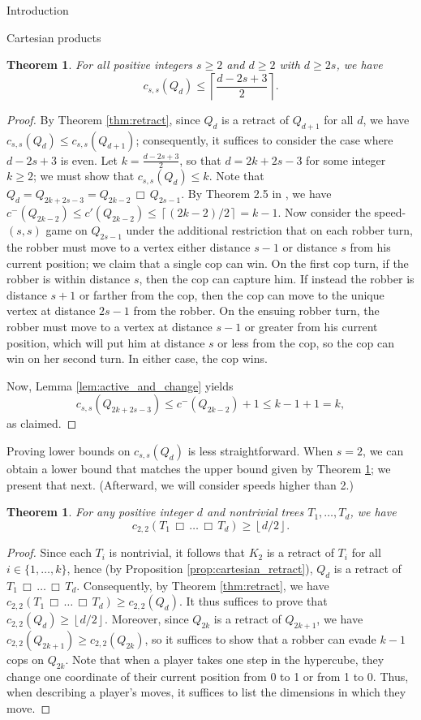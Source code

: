 \documentclass[12pt]{amsart}
\newcommand{\floor}[1]{\ensuremath{\left\lfloor #1\right\rfloor} }
\newcommand{\ceil}[1]{\ensuremath{\left\lceil #1\right\rceil} }
\newtheorem{theorem}[lemma]{Theorem}
\theoremstyle{definition}
\def\cart{\, \Box \,}
\newcommand{\speeds}{c_{s,s}}
\newcommand{\speedtwo}{c_{2,2}}
\begin{document}
\begin{section}{Introduction}
\begin{section}{Cartesian products}
\begin{theorem}\label{thm:hypercube_upper}
For all positive integers $s \ge 2$ and $d \ge 2$ with $d \ge 2s$, we have 
\[\speeds(Q_d) \le \ceil{\frac{d-2s+3}{2}}.\]
\end{theorem}
\begin{proof}
By Theorem \ref{thm:retract}, since $Q_d$ is a retract of $Q_{d+1}$ for all $d$, we have $\speeds(Q_d) \le \speeds(Q_{d+1})$; consequently, it suffices to consider the case where $d-2s+3$ is even.  Let $k = \frac{d-2s+3}{2}$, so that $d = 2k+2s-3$ for some integer $k \ge 2$; we must show that $\speeds(Q_d) \le k$.  Note that $Q_d = Q_{2k+2s-3} = Q_{2k-2} \cart Q_{2s-1}$.  By Theorem 2.5 in \cite{NN98}, we have $c^-(Q_{2k-2}) \le c'(Q_{2k-2}) \le \ceil{(2k-2)/2} = k-1$.  Now consider the speed-$(s,s)$ game on $Q_{2s-1}$ under the additional restriction that on each robber turn, the robber must move to a vertex either distance $s-1$ or distance $s$ from his current position; we claim that a single cop can win.  On the first cop turn, if the robber is within distance $s$, then the cop can capture him.  If instead the robber is distance $s+1$ or farther from the cop, then the cop can move to the unique vertex at distance $2s-1$ from the robber.  On the ensuing robber turn, the robber must move to a vertex at distance $s-1$ or greater from his current position, which will put him at distance $s$ or less from the cop, so the cop can win on her second turn.  In either case, the cop wins.

Now, Lemma \ref{lem:active_and_change} yields 
\[\speeds(Q_{2k+2s-3}) \le c^-(Q_{2k-2}) + 1 \le k-1+1 = k,\]
as claimed.
\end{proof}

Proving lower bounds on $\speeds(Q_d)$ is less straightforward.  When $s=2$, we can obtain a lower bound that matches the upper bound given by Theorem \ref{thm:hypercube_upper}; we present that next.  (Afterward, we will consider speeds higher than 2.)

\begin{theorem}\label{thm:speed_2}
For any positive integer $d$ and nontrivial trees $T_1, \dots, T_d$, we have 
\[\speedtwo(T_1 \cart \dots \cart T_d) \ge \floor{d/2}.\]
\end{theorem}
\begin{proof}
Since each $T_i$ is nontrivial, it follows that $K_2$ is a retract of $T_i$ for all $i \in \{1, \dots, k\}$, hence (by Proposition \ref{prop:cartesian_retract}), $Q_d$ is a retract of $T_1 \cart \dots \cart T_d$.  Consequently, by Theorem \ref{thm:retract}, we have $\speedtwo(T_1 \cart \dots \cart T_d) \ge \speedtwo(Q_d)$.  It thus suffices to prove that $\speedtwo(Q_d) \ge \floor{d/2}$.  Moreover, since $Q_{2k}$ is a retract of $Q_{2k+1}$, we have $\speedtwo(Q_{2k+1}) \ge \speedtwo(Q_{2k})$, so it suffices to show that a robber can evade $k-1$ cops on $Q_{2k}$.  Note that when a player takes one step in the hypercube, they change one coordinate of their current position from 0 to 1 or from 1 to 0.  Thus, when describing a player's moves, it suffices to list the dimensions in which they move.


\end{proof}
\end{section}
\end{section}
\end{document}

